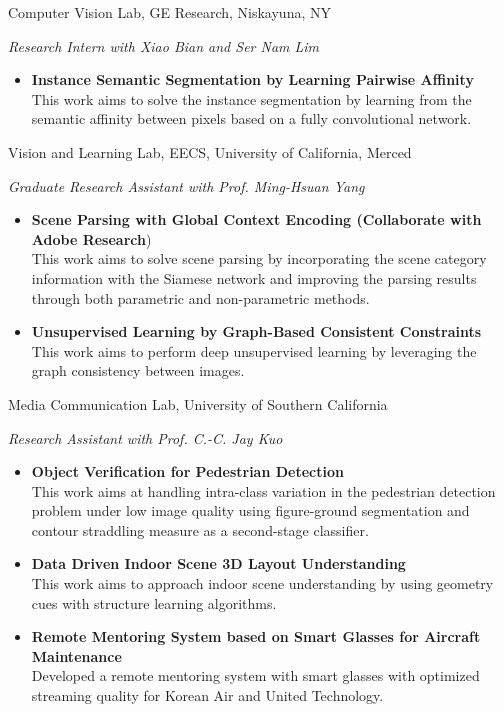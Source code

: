 \documentclass[11pt,letterpaper,sans]{moderncv} %
\begin{document}
%
{Computer Vision Lab, GE Research, Niskayuna, NY}
{}{}{}
{
	\textit{Research Intern with Xiao Bian and Ser Nam Lim}
	\begin{itemize}
		\item \textbf{Instance Semantic Segmentation by Learning Pairwise Affinity} \\
		This work aims to solve the instance segmentation by learning from the semantic affinity between pixels based on a fully convolutional network.
	\end{itemize}
}


%
{Vision and Learning Lab, EECS, University of California, Merced}
{}{}{}
{
\textit{Graduate Research Assistant with Prof. Ming-Hsuan Yang}
%
\begin{itemize}
	\item \textbf{Scene Parsing with Global Context Encoding (Collaborate with Adobe Research})\\
	This work aims to solve scene parsing by incorporating the scene category information with the Siamese network and improving the parsing results through both parametric and non-parametric methods.
	\item \textbf{Unsupervised Learning by Graph-Based Consistent Constraints}\\
	This work aims to perform deep unsupervised learning by leveraging the graph consistency between images.
\end{itemize}
}




%
{Media Communication Lab, University of Southern California}
{}{}{}
{
	\textit{Research Assistant with Prof. C.-C. Jay Kuo}
	\begin{itemize}
		\item \textbf{Object Verification for Pedestrian Detection} \\
		This work aims at handling intra-class variation in the pedestrian detection problem under low image quality using figure-ground segmentation and contour straddling measure as a second-stage classifier.
		\item \textbf{Data Driven Indoor Scene 3D Layout Understanding} \\
		This work aims to approach indoor scene understanding by using geometry cues with structure learning algorithms.
		\item \textbf{Remote Mentoring System based on Smart Glasses for Aircraft Maintenance} \\
		Developed a remote mentoring system with smart glasses with optimized streaming quality for Korean Air and United Technology. 
	\end{itemize}
}
\end{document}
